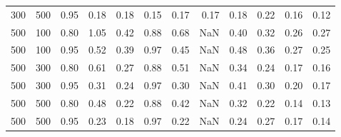 \begin{tabular}{rrrrrrrrrrrr}
300 & 500 & 0.95 &    0.18 &            0.18 &            0.15 &           0.17 &              0.17 &               0.18 &               0.22 &                0.16 &             0.12 \\
500 & 100 & 0.80 &    1.05 &            0.42 &            0.88 &           0.68 &               NaN &               0.40 &               0.32 &                0.26 &             0.27 \\
500 & 100 & 0.95 &    0.52 &            0.39 &            0.97 &           0.45 &               NaN &               0.48 &               0.36 &                0.27 &             0.25 \\
500 & 300 & 0.80 &    0.61 &            0.27 &            0.88 &           0.51 &               NaN &               0.34 &               0.24 &                0.17 &             0.16 \\
500 & 300 & 0.95 &    0.31 &            0.24 &            0.97 &           0.30 &               NaN &               0.41 &               0.30 &                0.20 &             0.17 \\
500 & 500 & 0.80 &    0.48 &            0.22 &            0.88 &           0.42 &               NaN &               0.32 &               0.22 &                0.14 &             0.13 \\
500 & 500 & 0.95 &    0.23 &            0.18 &            0.97 &           0.22 &               NaN &               0.24 &               0.27 &                0.17 &             0.14 \\
\bottomrule
\end{tabular}
